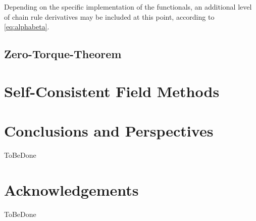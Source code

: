 \documentclass[12pt]{article}
\newcommand*{\grad}{\vec{\nabla}}
\newcommand*{\dder}[2]{\frac{\delta #1}{\delta #2}}
\begin{document}
Depending on the specific implementation of the functionals, an additional level of chain rule derivatives may be included at this point, according to \cref{eq:alphabeta}.
\iffalse
Some chain rule derivatives are trivial, we collect here some less immediate ones:
\begin{gather*}
 \dder{m}{\vec{m}} = \frac{\vec{m}}{m} \quad;\quad
 \dder{\gamma_{nn}}{\grad n} = 2\grad n \quad;\quad
 \dder{\gamma_{mm}}{\grad\vec{m}} = 2\grad \vec{m} \\
 \dder{\gamma_{nm}}{\grad n} = f_\nabla\sqrt{(\grad n \cdot \grad\vec{m})\circ\grad\vec{m}} \quad;\quad
 \dder{\gamma_{nm}}{\grad \vec{m}} = f_\nabla\sqrt{(\grad n \cdot \grad\vec{m}) \grad n}
\end{gather*}
\fi

\subsection{Zero-Torque-Theorem}

\section{Self-Consistent Field Methods}

\section{Conclusions and Perspectives}
ToBeDone

\section{Acknowledgements}
ToBeDone

\newpage


\end{document}
